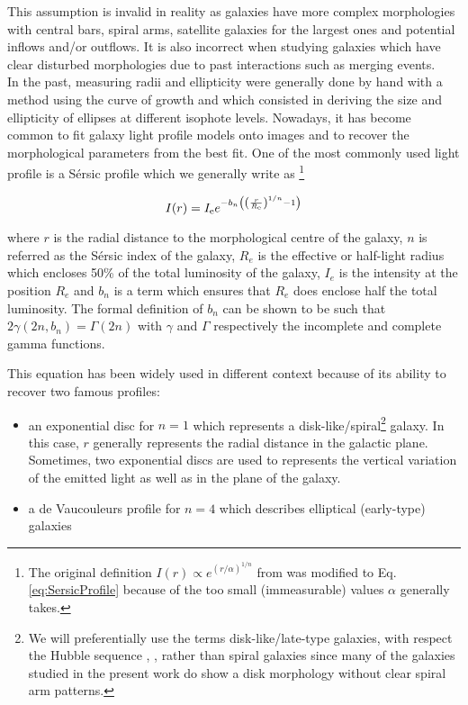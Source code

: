 This assumption is invalid in reality as galaxies have more complex morphologies with central bars, spiral arms, satellite galaxies for the largest ones and potential inflows and/or outflows. It is also incorrect when studying galaxies which have clear disturbed morphologies due to past interactions such as merging events.  \\

In the past, measuring radii and ellipticity were generally done by hand with a method using the curve of growth and which consisted in deriving the size and ellipticity of ellipses at different isophote levels. Nowadays, it has become common to fit galaxy light profile models onto images and to recover the morphological parameters from the best fit. One of the most commonly used light profile is a Sérsic profile which we generally write as \footnote{The original definition $I(r) \propto e^{(r/\alpha)^{1/n}}$ from  was modified to Eq.\,\ref{eq:SersicProfile} because of the too small (immeasurable) values $\alpha$ generally takes.} 

\begin{equation}
    \label{eq:SersicProfile}
    I(r) = I_{\rm{e}} e^{ - b_n \left ( \left  ( \frac{r}{R_{\rm{e}}}  \right )^{1/n} - 1 \right ) }
\end{equation}

where $r$ is the radial distance to the morphological centre of the galaxy, $n$ is referred as the Sérsic index of the galaxy, $R_e$ is the effective or half-light radius which encloses 50\% of the total luminosity of the galaxy, $I_e$ is the intensity at the position $R_e$ and $b_n$ is a term which ensures that $R_e$ does enclose half the total luminosity. The formal definition of $b_n$ can be shown to be such that $2 \gamma (2n, b_n) = \Gamma (2n)$ with $\gamma$ and $\Gamma$ respectively the incomplete and complete gamma functions.

This equation has been widely used in different context because of its ability to recover two famous profiles:

\begin{itemize}
    \item an exponential disc for $n = 1$ which represents a disk-like/spiral\footnote{We will preferentially use the terms disk-like/late-type galaxies, with respect the Hubble sequence ,  , rather than spiral galaxies since many of the galaxies studied in the present work do show a disk morphology without clear spiral arm patterns.} galaxy. In this case, $r$ generally represents the radial distance in the galactic plane. Sometimes, two exponential discs are used to represents the vertical variation of the emitted light as well as in the plane of the galaxy. 
    \item a de Vaucouleurs profile for $n = 4$ which describes elliptical (early-type) galaxies
\end{itemize}

